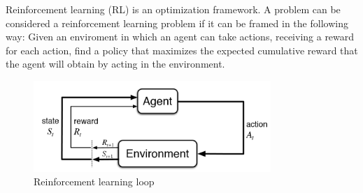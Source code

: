 \documentclass{../main.tex}{}
\begin{document}
Reinforcement learning (RL) is an optimization framework. A problem can be considered a reinforcement learning problem if it can be framed in the following way: Given an enviroment in which an agent can take actions, receiving a reward for each action, find a policy that maximizes the expected cumulative reward that the agent will obtain by acting in the environment.

\begin{figure}[h]
    \centering
    \includegraphics[width=0.8\textwidth]{images/rl-loop}
    \caption{Reinforcement learning loop}
    \label{fig:rl-loop}
\end{figure}
\end{document}
